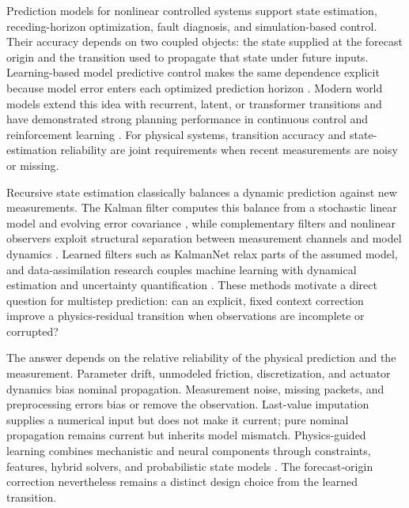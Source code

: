 \documentclass[pdflatex,sn-basic]{sn-jnl}
\begin{document}
Prediction models for nonlinear controlled systems support state estimation,
receding-horizon optimization, fault diagnosis, and simulation-based control.
Their accuracy depends on two coupled objects: the state supplied at the
forecast origin and the transition used to propagate that state under future
inputs. Learning-based model predictive control makes the same dependence
explicit because model error enters each optimized prediction horizon
\citep{hewing2020_learning_mpc}. Modern world models extend this idea with
recurrent, latent, or transformer transitions and have demonstrated strong
planning performance in continuous control and reinforcement learning
\citep{hafner2025_mastering_diverse_control_tasks_through,hansen2023_td_mpc2_scalable_robust_world,micheli2022_transformers_are_sample_efficient_world,zhang2023_storm_efficient_stochastic_transformer_based}.
For physical systems, transition accuracy and state-estimation reliability are
joint requirements when recent measurements are noisy or missing.

Recursive state estimation classically balances a dynamic prediction against
new measurements. The Kalman filter computes this balance from a stochastic
linear model and evolving error covariance \citep{kalman1960_filtering}, while
complementary filters and nonlinear observers exploit structural separation
between measurement channels and model dynamics
\citep{mahony2008_complementary,zhao2023_wheel_rail_observer}. Learned filters
such as KalmanNet relax parts of the assumed model, and data-assimilation
research couples machine learning with dynamical estimation and uncertainty
quantification
\citep{revach2022_kalmannet,cheng2023_machine_learning_with_data_assimilation}.
These methods motivate a direct question for multistep prediction: can an
explicit, fixed context correction improve a physics-residual transition when
observations are incomplete or corrupted?

The answer depends on the relative reliability of the physical prediction and
the measurement. Parameter drift, unmodeled friction, discretization, and
actuator dynamics bias nominal propagation. Measurement noise, missing packets,
and preprocessing errors bias or remove the observation. Last-value imputation
supplies a numerical input but does not make it current; pure nominal
propagation remains current but inherits model mismatch. Physics-guided
learning combines mechanistic and neural components through constraints,
features, hybrid solvers, and probabilistic state models
\citep{karniadakis2021_physics_informed_machine_learning,willard2022_integrating_scientific_knowledge_with_machine,yu2024_learning_dynamical_systems_from_data,shen2023_differentiable_modelling_to_unify_machine}.
The forecast-origin correction nevertheless remains a distinct design choice
from the learned transition.
\end{document}
